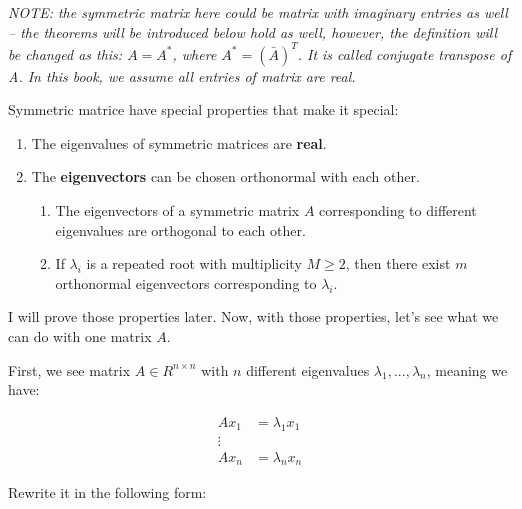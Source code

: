 \documentclass[a4paper]{book}
\begin{document}
      \textit{NOTE: the symmetric matrix here could be matrix with
        imaginary entries as well -- the theorems will be introduced
        below hold as well, however, the definition will be changed as
        this: $A = A^{*}$, where $A^{*} =
        (\bar{A})^T$\cite{wiki_conjugate_transpose}. It is called
        conjugate transpose of A. In this book, we assume all entries of
        matrix are real.}

      Symmetric matrice have special properties that make it
      special\cite{strang2009introduction}\cite{richard_some_basic_matrix_theorems}:

      \begin{enumerate}
        \item The eigenvalues of symmetric matrices are \textbf{real}.
        \item The \textbf{eigenvectors} can be chosen orthonormal with
          each other.
          \begin{enumerate}
            \item The eigenvectors of a symmetric matrix $A$
              corresponding to different eigenvalues are orthogonal to
              each other.
            \item If $\lambda_{i}$ is a repeated root with multiplicity
              $M \geq 2$, then there exist $m$ orthonormal eigenvectors
              corresponding to $\lambda_{i}$.
          \end{enumerate}
      \end{enumerate}

      I will prove those properties later. Now, with those properties,
      let's see what we can do with one matrix $A$.

      First, we see matrix $A \in R^{n \times n}$ with $n$ different
      eigenvalues $\lambda_{1}, ... , \lambda_{n}$, meaning we have:

      \begin{align*}
        Ax_{1} & =  \lambda_{1}x_{1}\\
        \vdots  \\
        Ax_{n} & =  \lambda_{n}x_{n}
      \end{align*}

      Rewrite it in the following form:
\end{document}
